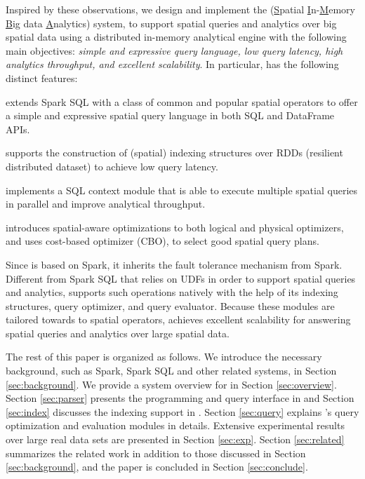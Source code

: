Inspired by these observations, we design and implement the \name
(\underline{S}patial \underline{I}n-\underline{M}emory \underline{B}ig
data \underline{A}nalytics) system, to support spatial queries and
analytics over big spatial data using a distributed in-memory
analytical engine with the following main objectives: {\em simple and
  expressive query language, low query latency, high analytics
  throughput, and excellent scalability}. In particular, \name has the
following distinct features:
\begin{pkl}
\item \name extends Spark SQL with a class of common and
  popular spatial operators to offer a simple and expressive spatial
  query language in both SQL and DataFrame APIs.
\item \name supports the construction of (spatial) indexing
  structures over RDDs (resilient distributed dataset) to achieve low
  query latency.
\item \name implements a SQL context module that is able to
  execute multiple spatial queries in parallel and improve analytical
  throughput.
\item \name introduces spatial-aware optimizations to both logical and
  physical optimizers, and uses cost-based optimizer (CBO), to select
  good spatial query plans.
\end{pkl}

Since \name is based on Spark, it inherits the fault tolerance
mechanism from Spark. Different from Spark SQL that relies on UDFs in
order to support spatial queries and analytics, \name supports
such operations natively with the help of its indexing structures,
query optimizer, and query evaluator. Because these modules are
tailored towards to spatial operators, \name achieves excellent
scalability for answering spatial queries and analytics over large
spatial data.

The rest of this paper is organized as follows. We introduce the
necessary background, such as Spark, Spark SQL and other related
systems, in Section \ref{sec:background}. We provide a system overview
for \name in Section \ref{sec:overview}. Section \ref{sec:parser}
presents the programming and query interface in \name and Section
\ref{sec:index} discusses the indexing support in \name. Section
\ref{sec:query} explains \name's query optimization and evaluation
modules in details. Extensive experimental results over large real
data sets are presented in Section \ref{sec:exp}. Section
\ref{sec:related} summarizes the related work in addition to those
discussed in Section \ref{sec:background}, and the paper is concluded
in Section \ref{sec:conclude}.


